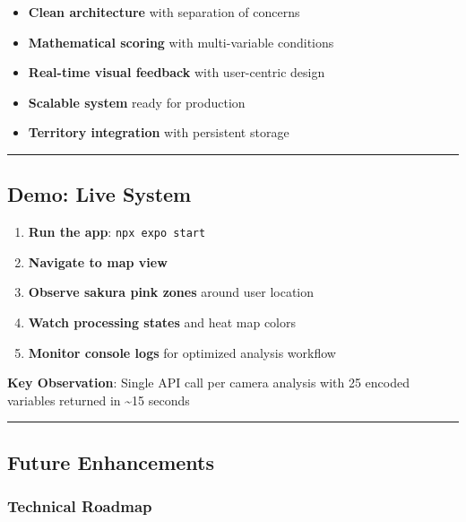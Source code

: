 \documentclass[
  letterpaper,
  DIV=11,
  numbers=noendperiod]{scrartcl}
\providecommand{\tightlist}{%
  \setlength{\itemsep}{0pt}\setlength{\parskip}{0pt}}
\begin{document}
\begin{itemize}
\tightlist
\item
  \textbf{Clean architecture} with separation of concerns
\item
  \textbf{Mathematical scoring} with multi-variable conditions
\item
  \textbf{Real-time visual feedback} with user-centric design
\item
  \textbf{Scalable system} ready for production
\item
  \textbf{Territory integration} with persistent storage
\end{itemize}

\begin{center}\rule{0.5\linewidth}{0.5pt}\end{center}

\subsection{Demo: Live System}\label{demo-live-system}

\begin{enumerate}
\def\labelenumi{\arabic{enumi}.}
\tightlist
\item
  \textbf{Run the app}: \texttt{npx\ expo\ start}
\item
  \textbf{Navigate to map view}
\item
  \textbf{Observe sakura pink zones} around user location
\item
  \textbf{Watch processing states} and heat map colors
\item
  \textbf{Monitor console logs} for optimized analysis workflow
\end{enumerate}

\textbf{Key Observation}: Single API call per camera analysis with 25
encoded variables returned in \textasciitilde15 seconds

\begin{center}\rule{0.5\linewidth}{0.5pt}\end{center}

\subsection{Future Enhancements}\label{future-enhancements}

\subsubsection{Technical Roadmap}\label{technical-roadmap}
\end{document}
